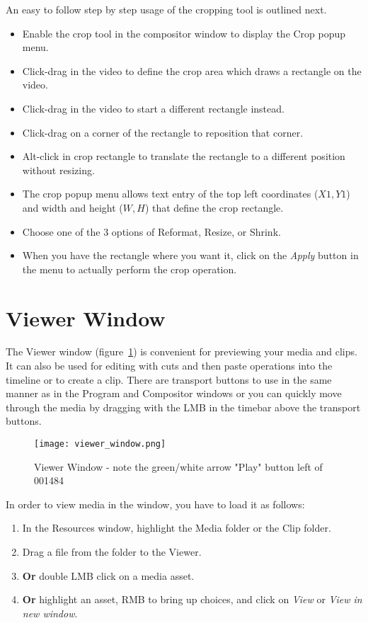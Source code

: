An easy to follow step by step usage of the cropping tool is outlined next.
\begin{itemize}
    \item Enable the crop tool in the compositor window to display the Crop popup menu.
    \item Click-drag in the video to define the crop area which draws a rectangle on the video.
    \item Click-drag in the video to start a different rectangle instead.
    \item Click-drag on a corner of the rectangle to reposition that corner.
    \item Alt-click in crop rectangle to translate the rectangle to a different position without resizing.
    \item The crop popup menu allows text entry of the top left coordinates ($X1,Y1$) and width and
height ($W, H$) that define the crop rectangle. 
    \item Choose one of the 3 options of Reformat, Resize, or Shrink.
    \item When you have the rectangle where you want it,
click on the \emph{Apply} button in the menu to actually perform the crop operation.
\end{itemize}
 

\section{Viewer Window}%
\label{sec:viewer_window}

The Viewer window (figure~\ref{fig:viewer_window}) is convenient for previewing your media and 
clips. It can also be used for editing with cuts and then paste operations into the timeline or
to create a clip.  There are transport buttons to use in the same manner as in the Program
and Compositor windows or you can quickly move through the media by dragging with the LMB in
the timebar above the transport buttons.  

\begin{figure}[htpb]
    \centering
    \texttt{[image: viewer\_window.png]}
    \caption{Viewer Window - note the green/white arrow "Play" button left of 001484}
    \label{fig:viewer_window}
\end{figure}

In order to view media in the window, you have to load it as follows:

\begin{enumerate}
    \item  In the Resources window, highlight the Media folder or the Clip folder.
    \item  Drag a file from the folder to the Viewer.
    \item  \textbf{Or} double LMB click on a media asset.
    \item  \textbf{Or} highlight an asset, RMB to bring up choices, and click on \textit{View} or
\textit{View in new window}.
\end{enumerate}

